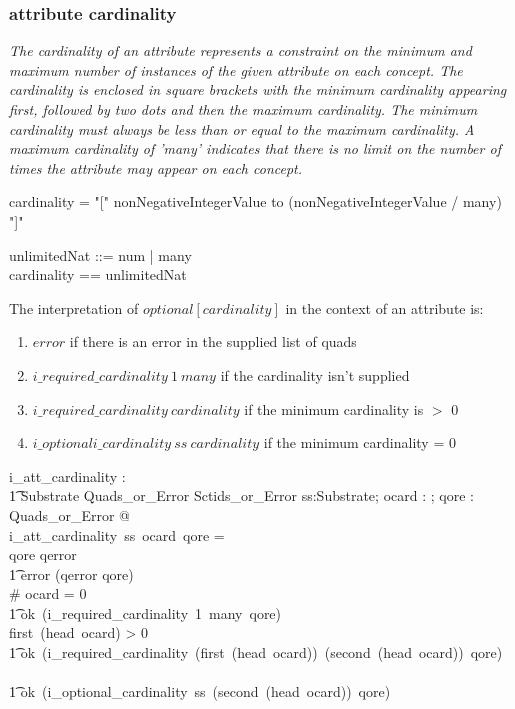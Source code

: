 \documentclass{article}
\def\bnf#1{{\scriptsize {{#1}} }}
\def\desc#1{{\small \textsl{{#1}} }}
\begin{document}
\subsubsection{attribute cardinality}
\begin{framed}
\desc{The cardinality of an attribute represents a constraint on the minimum and maximum number of instances of the given attribute on each concept. The cardinality is enclosed in square brackets with the minimum cardinality appearing first, followed by two dots and then the maximum cardinality. The minimum cardinality must always be less than or equal to the maximum cardinality. A maximum cardinality of 'many' indicates that there is no limit on the number of times the attribute may appear on each concept.}
\end{framed}
\begin{framed}
\bnf{cardinality = "[" nonNegativeIntegerValue to (nonNegativeIntegerValue / many) "]"}
\end{framed}

\begin{zed}
unlimitedNat ::= num \ldata \nat \rdata | many \\
cardinality == \nat \cross unlimitedNat \\
\end{zed}
   
The interpretation of $optional[cardinality]$ in the context of an attribute is:
\begin{enumerate}[noitemsep]
\item $error$ if there is an error in the supplied list of quads 
\item $i\_required\_cardinality~1~many$ if the cardinality isn't supplied 
\item $i\_required\_cardinality~cardinality$ if the minimum cardinality is $>$ 0
\item $i\_optionali\_cardinality~ss~cardinality$ if the minimum cardinality = 0
\end{enumerate}


\begin{gendef}
   i\_att\_cardinality : \\
\t1 Substrate \fun \optional[cardinality] \fun Quads\_or\_Error \fun Sctids\_or\_Error
\where
   \forall ss:Substrate; ocard : \optional[cardinality]; qore : Quads\_or\_Error @ \\
   i\_att\_cardinality~ss~ocard~qore = \\
\IF qore \in \ran qerror \THEN \\
\t1 error (qerror \inv qore) \\
\ELSE \IF \# ocard = 0 \THEN \\
\t1 ok~(i\_required\_cardinality~1~many~qore) \\
\ELSE \IF first~(head~ocard) > 0 \THEN \\
\t1 ok~(i\_required\_cardinality~(first~(head~ocard))~(second~(head~ocard))~qore) \\
\ELSE \\
\t1 ok~(i\_optional\_cardinality~ss~(second~(head~ocard))~qore)
\end{gendef}
\end{document}
